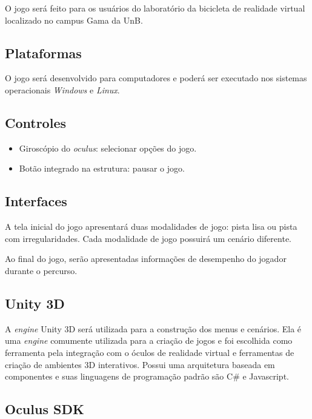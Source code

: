 O jogo será feito para os usuários do laboratório da bicicleta de realidade virtual localizado no campus Gama da UnB.

\subsection{Plataformas}

O jogo será desenvolvido para computadores e poderá ser executado nos sistemas operacionais \textit{Windows} e \textit{Linux}.

\subsection{Controles}

\begin{itemize}
\item Giroscópio do \textit{oculus}: selecionar opções do jogo.
\item Botão integrado na estrutura: pausar o jogo.
\end{itemize}

\subsection{Interfaces}

A tela inicial do jogo apresentará duas modalidades de jogo: pista lisa ou pista com irregularidades. Cada modalidade de jogo possuirá um cenário diferente.

Ao final do jogo, serão apresentadas informações de desempenho do jogador durante o percurso.

\subsection{Unity 3D}

A \textit{engine} Unity 3D será utilizada para a construção dos menus e cenários. Ela é uma \textit{engine} comumente utilizada para a criação de jogos e foi escolhida como ferramenta pela integração com o óculos de realidade virtual e ferramentas de criação de ambientes 3D interativos. Possui uma arquitetura baseada em componentes e suas linguagens de programação padrão são C\# e Javascript.

\subsection{Oculus SDK}

